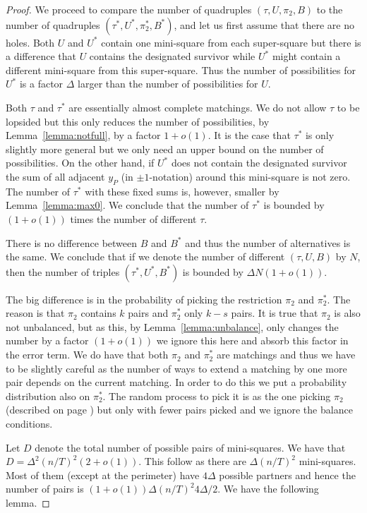 \documentclass{theoretics}
\begin{document}
\begin{proof}
We proceed to compare the number of quadruples 
$(\tau, U, \pi_2, B)$ to the number of quadruples
$(\tau^*, U^*, \pi_2^*, B^*)$, and let us first assume that there
are no holes.  Both $U$ and 
$U^*$ contain one mini-square from each super-square but
there is a difference that $U$ contains the designated
survivor while $U^*$ might contain a different mini-square
from this super-square.  Thus the number of possibilities
for $U^*$ is a factor $\Delta$ larger than the
number of possibilities for $U$.

Both $\tau$ and $\tau^*$ are essentially almost complete matchings.
We do not allow $\tau$ to be lopsided but this only reduces
the number of possibilities, by Lemma~\ref{lemma:notfull},
by a factor $1+o(1)$.  It is the case that $\tau^*$
is only slightly more general but we only need
an upper bound on the number of possibilities.
On the other hand, if $U^*$ does not contain the designated
survivor the
sum of all adjacent $y_P$ (in $\pm 1$-notation)
around this mini-square is not zero.  
The number of $\tau^*$ with
these fixed sums is, however, smaller by Lemma~\ref{lemma:max0}.
We conclude that the number of $\tau^*$ is bounded by
$(1+o(1))$ times the number of different $\tau$.

There is no difference between $B$ and $B^*$ and
thus the number of alternatives is the same.
We conclude that if we denote the number of different 
$(\tau, U,B)$ by $N$, then the number of triples
$(\tau^*, U^*,B^*)$ is bounded by $\Delta N (1+o(1))$.

The big difference is in the probability of picking the restriction
 $\pi_2$ and $\pi_2^*$.  The reason is that $\pi_2$ contains $k$
pairs and $\pi_2^*$ only $k-s$ pairs.
It is true that $\pi_2$ is also not unbalanced,
but as this, by Lemma~\ref{lemma:unbalance},
only changes the number by a factor $(1+o(1))$ we ignore
this here and absorb this factor in the error term.   We do have
that both $\pi_2$ and $\pi_2^*$
are matchings and thus we have to be slightly
careful as the number of ways to extend a matching
by one more pair depends on the current matching.
In order to do this we put a probability distribution
also on $\pi_2^*$.   The random process to pick it is
as the one picking $\pi_2$ (described on page \pageref{distribution})
but only with fewer pairs picked and we ignore the balance
conditions.

Let $D$ denote the total number of
possible pairs of mini-squares.  We have that $D= \Delta^2 (n/T)^2 (2+o(1))$.
This follow as there are $\Delta (n/T)^2$ mini-squares. Most of
them (except at the perimeter) have $4 \Delta$ possible partners
and hence the number of pairs is $(1+o(1))\Delta (n/T)^2 4 \Delta/2$.
We have the following lemma.


\end{proof}
\end{document}
